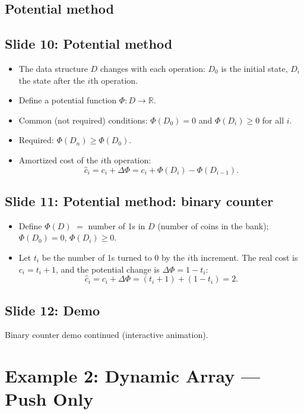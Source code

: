 \documentclass[11pt]{article}
\newcommand{\slide}[2]{\subsection*{Slide #1: #2}}
\begin{document}
\subsection*{Potential method}

\slide{10}{Potential method}
\begin{itemize}
  \item The data structure $D$ changes with each operation: $D_0$ is the initial state, $D_i$ the state after the $i$th operation.
  \item Define a potential function $\Phi : D \to \mathbb{R}$.
  \item Common (not required) conditions: $\Phi(D_0) = 0$ and $\Phi(D_i) \ge 0$ for all $i$.
  \item Required: $\Phi(D_n) \ge \Phi(D_0)$.
  \item Amortized cost of the $i$th operation:
        \[ \hat{c}_i = c_i + \Delta\Phi = c_i + \Phi(D_i) - \Phi(D_{i-1}). \]
\end{itemize}

\slide{11}{Potential method: binary counter}
\begin{itemize}
  \item Define $\Phi(D)$ $=$ number of 1s in $D$ (number of coins in the bank); $\Phi(D_0) = 0$, $\Phi(D_i) \ge 0$.
  \item Let $t_i$ be the number of 1s turned to 0 by the $i$th increment. The real cost is $c_i = t_i + 1$, and the potential change is $\Delta\Phi = 1 - t_i$:
        \[ \hat{c}_i = c_i + \Delta\Phi = (t_i + 1) + (1 - t_i) = 2. \]
\end{itemize}

\slide{12}{Demo}
Binary counter demo continued (interactive animation).

\section{Example 2: Dynamic Array --- Push Only}
\end{document}
